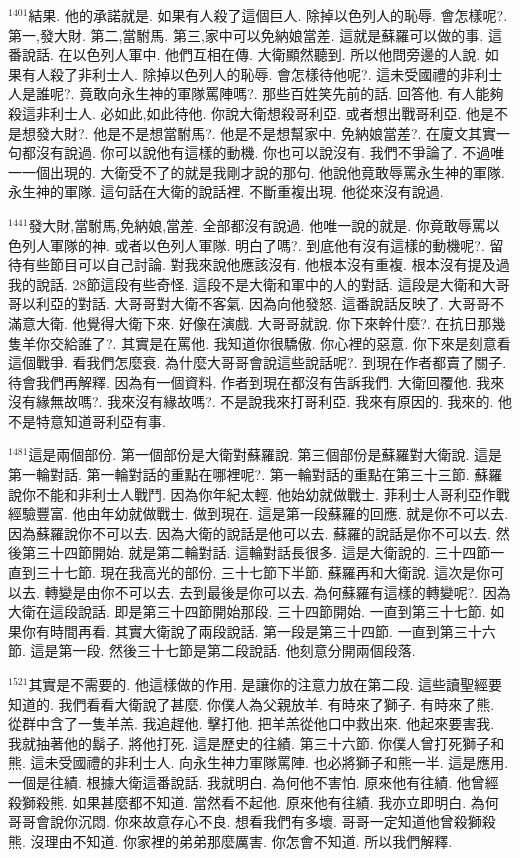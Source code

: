 \documentclass{book}
\begin{document}
$^{1401}$結果.
他的承諾就是.
如果有人殺了這個巨人.
除掉以色列人的恥辱.
會怎樣呢?.
第一,發大財.
第二,當駙馬.
第三,家中可以免納娘當差.
這就是蘇羅可以做的事.
這番說話.
在以色列人軍中.
他們互相在傳.
大衛顯然聽到.
所以他問旁邊的人說.
如果有人殺了非利士人.
除掉以色列人的恥辱.
會怎樣待他呢?.
這未受國禮的非利士人是誰呢?.
竟敢向永生神的軍隊罵陣嗎?.
那些百姓笑先前的話.
回答他.
有人能夠殺這非利士人.
必如此,如此待他.
你說大衛想殺哥利亞.
或者想出戰哥利亞.
他是不是想發大財?.
他是不是想當駙馬?.
他是不是想幫家中.
免納娘當差?.
在廈文其實一句都沒有說過.
你可以說他有這樣的動機.
你也可以說沒有.
我們不爭論了.
不過唯一一個出現的.
大衛受不了的就是我剛才說的那句.
他說他竟敢辱罵永生神的軍隊.
永生神的軍隊.
這句話在大衛的說話裡.
不斷重複出現.
他從來沒有說過.

$^{1441}$發大財,當駙馬,免納娘,當差.
全部都沒有說過.
他唯一說的就是.
你竟敢辱罵以色列人軍隊的神.
或者以色列人軍隊.
明白了嗎?.
到底他有沒有這樣的動機呢?.
留待有些節目可以自己討論.
對我來說他應該沒有.
他根本沒有重複.
根本沒有提及過我的說話.
28節這段有些奇怪.
這段不是大衛和軍中的人的對話.
這段是大衛和大哥哥以利亞的對話.
大哥哥對大衛不客氣.
因為向他發怒.
這番說話反映了.
大哥哥不滿意大衛.
他覺得大衛下來.
好像在演戲.
大哥哥就說.
你下來幹什麼?.
在抗日那幾隻羊你交給誰了?.
其實是在罵他.
我知道你很驕傲.
你心裡的惡意.
你下來是刻意看這個戰爭.
看我們怎麼衰.
為什麼大哥哥會說這些說話呢?.
到現在作者都賣了關子.
待會我們再解釋.
因為有一個資料.
作者到現在都沒有告訴我們.
大衛回覆他.
我來沒有緣無故嗎?.
我來沒有緣故嗎?.
不是說我來打哥利亞.
我來有原因的.
我來的.
他不是特意知道哥利亞有事.

$^{1481}$這是兩個部份.
第一個部份是大衛對蘇羅說.
第三個部份是蘇羅對大衛說.
這是第一輪對話.
第一輪對話的重點在哪裡呢?.
第一輪對話的重點在第三十三節.
蘇羅說你不能和非利士人戰鬥.
因為你年紀太輕.
他始幼就做戰士.
菲利士人哥利亞作戰經驗豐富.
他由年幼就做戰士.
做到現在.
這是第一段蘇羅的回應.
就是你不可以去.
因為蘇羅說你不可以去.
因為大衛的說話是他可以去.
蘇羅的說話是你不可以去.
然後第三十四節開始.
就是第二輪對話.
這輪對話長很多.
這是大衛說的.
三十四節一直到三十七節.
現在我高光的部份.
三十七節下半節.
蘇羅再和大衛說.
這次是你可以去.
轉變是由你不可以去.
去到最後是你可以去.
為何蘇羅有這樣的轉變呢?.
因為大衛在這段說話.
即是第三十四節開始那段.
三十四節開始.
一直到第三十七節.
如果你有時間再看.
其實大衛說了兩段說話.
第一段是第三十四節.
一直到第三十六節.
這是第一段.
然後三十七節是第二段說話.
他刻意分開兩個段落.

$^{1521}$其實是不需要的.
他這樣做的作用.
是讓你的注意力放在第二段.
這些讀聖經要知道的.
我們看看大衛說了甚麼.
你僕人為父親放羊.
有時來了獅子.
有時來了熊.
從群中含了一隻羊羔.
我追趕他.
擊打他.
把羊羔從他口中救出來.
他起來要害我.
我就抽著他的鬍子.
將他打死.
這是歷史的往績.
第三十六節.
你僕人曾打死獅子和熊.
這未受國禮的非利士人.
向永生神力軍隊罵陣.
也必將獅子和熊一半.
這是應用.
一個是往績.
根據大衛這番說話.
我就明白.
為何他不害怕.
原來他有往績.
他曾經殺獅殺熊.
如果甚麼都不知道.
當然看不起他.
原來他有往績.
我亦立即明白.
為何哥哥會說你沉悶.
你來故意存心不良.
想看我們有多壞.
哥哥一定知道他曾殺獅殺熊.
沒理由不知道.
你家裡的弟弟那麼厲害.
你怎會不知道.
所以我們解釋.
\end{document}
